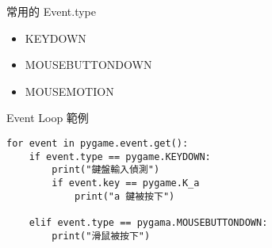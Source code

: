 \begin{mainpage}{4}{常用的 Event.type}
\vfill
\begin{itemize}
\item KEYDOWN
\item MOUSEBUTTONDOWN
\item MOUSEMOTION
\end{itemize}
\end{mainpage}
\newpage

\begin{tikzpage}{4}{Event Loop 範例}
\begin{tcolorbox}
\small
\begin{verbatim}
for event in pygame.event.get():
	if event.type == pygame.KEYDOWN:
		print("鍵盤輸入偵測")
		if event.key == pygame.K_a
			print("a 鍵被按下")
			
	elif event.type == pygama.MOUSEBUTTONDOWN:
		print("滑鼠被按下")
	
\end{verbatim}
\end{tcolorbox}
\end{tikzpage}
\newpage

